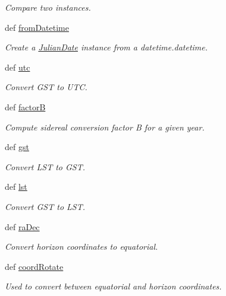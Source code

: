 \begin{DoxyCompactItemize}
\begin{DoxyCompactList}\small\item\em Compare two instances. \end{DoxyCompactList}\item 
def \hyperlink{namespaceamonpy_1_1sim_1_1sidereal_a4b33fef3bf95d11432a7e5d38e6c0915}{from\-Datetime}
\begin{DoxyCompactList}\small\item\em Create a \hyperlink{classamonpy_1_1sim_1_1sidereal_1_1_julian_date}{Julian\-Date} instance from a datetime.\-datetime. \end{DoxyCompactList}\item 
def \hyperlink{namespaceamonpy_1_1sim_1_1sidereal_a4b2a8e402bf171d31757ff6948a8a49b}{utc}
\begin{DoxyCompactList}\small\item\em Convert G\-S\-T to U\-T\-C. \end{DoxyCompactList}\item 
def \hyperlink{namespaceamonpy_1_1sim_1_1sidereal_a78a861d713d2bb72ba4a2e032b96ae6f}{factor\-B}
\begin{DoxyCompactList}\small\item\em Compute sidereal conversion factor B for a given year. \end{DoxyCompactList}\item 
def \hyperlink{namespaceamonpy_1_1sim_1_1sidereal_ad4e83a2a3e080065715e53d8d9175206}{gst}
\begin{DoxyCompactList}\small\item\em Convert L\-S\-T to G\-S\-T. \end{DoxyCompactList}\item 
def \hyperlink{namespaceamonpy_1_1sim_1_1sidereal_a52abb986a1bcc8647ff048a1e327433a}{lst}
\begin{DoxyCompactList}\small\item\em Convert G\-S\-T to L\-S\-T. \end{DoxyCompactList}\item 
def \hyperlink{namespaceamonpy_1_1sim_1_1sidereal_af288a9b5b40d2d20c8f2535e1b209654}{ra\-Dec}
\begin{DoxyCompactList}\small\item\em Convert horizon coordinates to equatorial. \end{DoxyCompactList}\item 
def \hyperlink{namespaceamonpy_1_1sim_1_1sidereal_a9de9ad6b4752a55300cff5a5d87d4711}{coord\-Rotate}
\begin{DoxyCompactList}\small\item\em Used to convert between equatorial and horizon coordinates. \end{DoxyCompactList}\item 

\end{DoxyCompactItemize}
